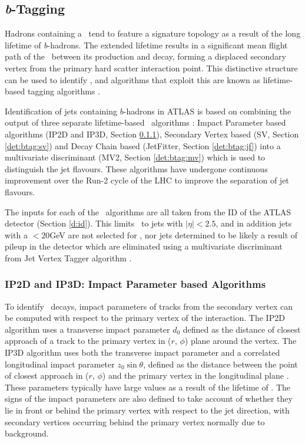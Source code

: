 \subsection{\textit{b}-Tagging}
\label{det:btagging}

	Hadrons containing a \bquark\, tend to feature a signature topology as a result of the long lifetime of \textit{b}-hadrons. The extended lifetime results in a significant mean flight path of the \bhadron\ between its production and decay, forming a displaced secondary vertex from the primary hard scatter interaction point. This distinctive structure can be used to identify \bjets, and algorithms that exploit this are known as lifetime-based tagging algorithms \cite{bTagPerformance}.

	Identification of jets containing $b$-hadrons in ATLAS is based on combining the output of three separate lifetime-based \btag\, algorithms \cite{bTagExpPerf}: Impact Parameter based algorithms (IP2D and IP3D, Section \ref{det:btag:ip}), Secondary Vertex based (SV, Section \ref{det:btag:sv}) and Decay Chain based (JetFitter, Section \ref{det:btag:jf}) into a multivariate discriminant (MV2, Section \ref{det:btag:mv}) which is used to distinguish the jet flavours. These algorithms have undergone continuous improvement over the Run-2 cycle of the LHC to improve the separation of jet flavours.

	The inputs for each of the \btagging\, algorithms are all taken from the ID of the ATLAS detector (Section \ref{d:id}). This limits \btagging\, to jets with $|\eta|<2.5$, and in addition jets with a \pt$<20$GeV are not selected for \btagging, nor jets determined to be likely a result of pileup in the detector which are eliminated using a multivariate discriminant from Jet Vertex Tagger algorithm \cite{btagOptimisation, pileup}.

	\subsubsection{IP2D and IP3D: Impact Parameter based Algorithms}
		\label{det:btag:ip}

		To identify \bhadron\ decays, impact parameters of tracks from the secondary vertex can be computed with respect to the primary vertex of the interaction. The IP2D algorithm uses a transverse impact parameter $d_0$ defined as the distance of closest approach of a track to the  primary vertex in ($r$, $\phi$) plane around the vertex. The IP3D algorithm uses both the transverse impact parameter and a correlated longitudinal impact parameter $z_0\sin\theta$, defined as the distance between the point of closest approach in ($r$, $\phi$) and the primary vertex in the longitudinal plane \cite{IP3D}. These parameters typically have large values as a result of the lifetime of \bquark. The signs of the impact parameters are also defined to take account of whether they lie in front or behind the primary vertex with respect to the jet direction, with secondary vertices occurring behind the primary vertex normally due to background.

